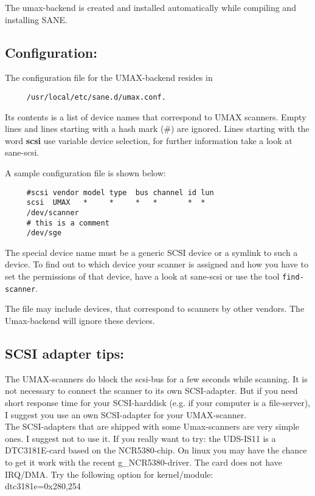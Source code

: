 The umax-backend is created and installed automatically while compiling
and installing SANE.

\subsection{Configuration:}

The configuration file for the UMAX-backend resides in

\begin{verbatim}
     /usr/local/etc/sane.d/umax.conf.
\end{verbatim}

Its contents is a list of device names that correspond to UMAX scanners.
Empty lines and lines starting with a hash mark (\#) are ignored.
Lines starting with the word {\bf scsi} use variable device selection,
for further information take a look at sane-scsi.

A sample configuration file is shown below:

\begin{verbatim}
     #scsi vendor model type  bus channel id lun
     scsi  UMAX   *     *     *   *       *  *
     /dev/scanner
     # this is a comment
     /dev/sge
\end{verbatim}


The special device name must be a generic SCSI device or a symlink to such a
device. To find out to which device your scanner is assigned and how you
have to set the permissions of that device, have a look at sane-scsi or
use the tool {\tt find-scanner}.

The file may include devices, that correspond to scanners by other vendors.
The Umax-backend will ignore these devices.


\subsection{SCSI adapter tips:}

The UMAX-scanners do block the scsi-bus for a few seconds while scanning.
It is not necessary to connect the scanner to its own SCSI-adapter.
But if you need short response time for your SCSI-harddisk (e.g. if your
computer is a file-server), I suggest you use an own SCSI-adapter for
your UMAX-scanner.\\

The SCSI-adapters that are shipped with some Umax-scanners are very simple ones.
I suggest not to use it. If you really want to try: the UDS-IS11 is a
DTC3181E-card based on the NCR5380-chip. On linux you may have the chance to get
it work with the recent g\_NCR5380-driver. The card does not have IRQ/DMA. Try the
following option for kernel/module:\\
    dtc3181e=0x280,254\\


